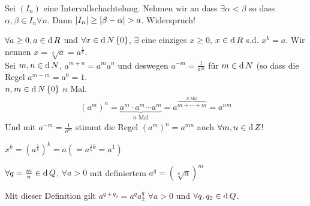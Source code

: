 \begin{Bew}
  Sei $(I_n)$ eine Intervallschachtelung. Nehmen wir an dass $\exists \alpha < \beta$ so dass $\alpha, \beta\in I_n\forall n$. Dann $\abs{I_n}\geq\abs{\beta-\alpha}> a$. Widerspruch!
\end{Bew}
\begin{Sat}
  $\forall a\geq 0, a\in\operatorname{d}{R}$ und $\forall x\in\operatorname{d}{N}\\\left\{ 0 \right\}$, $\exists$ eine einziges $x\geq 0$, $x\in \operatorname{d}{R}$ s.d. $x^k=a$. Wir nennen $x=\sqrt[k]{a}=a^\frac{1}{k}$.\\
  Sei $m,n\in\operatorname{d}{N}$, $a^{m+n}=a^ma^n$ und deswegen $a^{-m}=\frac{1}{a^m}$ für $m\in\operatorname{d}{N}$ (so dass die Regel $a^{m-m}=a^0=1$.\\
  $n,m\in\operatorname{d}{N}\\\left\{ 0 \right\}$ $n$ Mal.
  \begin{align*}
    (a^m)^n=\underbrace{a^m\cdot a^m \cdots a^m}_{\text{$n$ Mal}} = a^{\overbrace{m+\cdots+m}^{\text{$n$ Mal}}} = a^{nm}
  \end{align*}
  Und mit $a^{-m}=\frac{1}{a^m}$ stimmt die Regel $(a^m)^n=a^{mn}$ auch $\forall m,n\in\operatorname{d}{Z}$!
\end{Sat}
\begin{Bem}
    $x^k=\left( a^\frac{1}{k} \right)^k=a\left( =a^{\frac{1}{k}k} = a^1\right)$
\end{Bem}
\begin{Def}
  $\forall q=\frac{m}{n}\in\operatorname{d}{Q}$, $\forall a>0$ mit definiertem $a^q=\left(\sqrt[n]{a}\right)^m$
\end{Def}
\begin{Bew}
  Mit dieser Definition gilt $a^{q+q_2} = a^qa^q_2$ $\forall a>0$ und $\forall q,q_2\in\operatorname{d}{Q}$.
\end{Bew}
